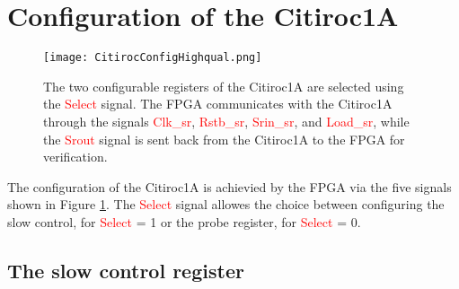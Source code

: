 \section{Configuration of the Citiroc1A}\label{sec:configuration}
\begin{figure}[h]
    \centering
    \texttt{[image: CitirocConfigHighqual.png]}
    \caption{The two configurable registers of the Citiroc1A are selected using the \textcolor{red}{Select} signal. 
    The FPGA communicates with the Citiroc1A through the signals \textcolor{red}{Clk\_sr}, \textcolor{red}{Rstb\_sr}, 
    \textcolor{red}{Srin\_sr}, and \textcolor{red}{Load\_sr}, while the \textcolor{red}{Srout} signal is sent back from the Citiroc1A to the FPGA for verification. \autocite{datasheetCITIROC}}
    \label{fig:CITIROC1A_config}
\end{figure}
The configuration of the Citiroc1A is achievied by the FPGA via the five signals shown in Figure \ref{fig:CITIROC1A_config}.
The \textcolor{red}{Select} signal allowes the choice between configuring the slow control, for \textcolor{red}{Select} = 1  or the probe register, for \textcolor{red}{Select} = 0.\autocite{datasheetCITIROC}

\subsection{The slow control register}

